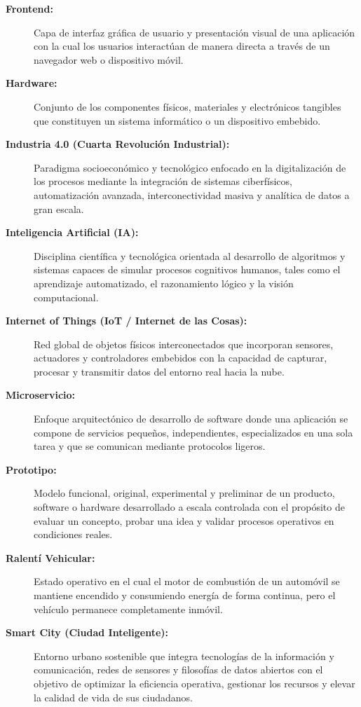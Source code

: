 \documentclass[12pt,a4paper]{article}
\begin{document}
\begin{description}
	\item[\textbf{Frontend:}] Capa de interfaz gráfica de usuario y presentación visual de una aplicación con la cual los usuarios interactúan de manera directa a través de un navegador web o dispositivo móvil.
	
	\item[\textbf{Hardware:}] Conjunto de los componentes físicos, materiales y electrónicos tangibles que constituyen un sistema informático o un dispositivo embebido.
	
	\item[\textbf{Industria 4.0 (Cuarta Revolución Industrial):}] Paradigma socioeconómico y tecnológico enfocado en la digitalización de los procesos mediante la integración de sistemas ciberfísicos, automatización avanzada, interconectividad masiva y analítica de datos a gran escala.
	
	\item[\textbf{Inteligencia Artificial (IA):}] Disciplina científica y tecnológica orientada al desarrollo de algoritmos y sistemas capaces de simular procesos cognitivos humanos, tales como el aprendizaje automatizado, el razonamiento lógico y la visión computacional.
	
	\item[\textbf{Internet of Things (IoT / Internet de las Cosas):}] Red global de objetos físicos interconectados que incorporan sensores, actuadores y controladores embebidos con la capacidad de capturar, procesar y transmitir datos del entorno real hacia la nube.
	
	\item[\textbf{Microservicio:}] Enfoque arquitectónico de desarrollo de software donde una aplicación se compone de servicios pequeños, independientes, especializados en una sola tarea y que se comunican mediante protocolos ligeros.
	
	\item[\textbf{Prototipo:}] Modelo funcional, original, experimental y preliminar de un producto, software o hardware desarrollado a escala controlada con el propósito de evaluar un concepto, probar una idea y validar procesos operativos en condiciones reales.
	
	\item[\textbf{Ralentí Vehicular:}] Estado operativo en el cual el motor de combustión de un automóvil se mantiene encendido y consumiendo energía de forma continua, pero el vehículo permanece completamente inmóvil.
	
	\item[\textbf{Smart City (Ciudad Inteligente):}] Entorno urbano sostenible que integra tecnologías de la información y comunicación, redes de sensores y filosofías de datos abiertos con el objetivo de optimizar la eficiencia operativa, gestionar los recursos y elevar la calidad de vida de sus ciudadanos.
	

\end{description}
\end{document}

